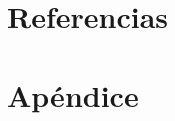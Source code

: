 \documentclass[letterpaper]{article}
\begin{document}
\section{Referencias}
\section{Apéndice}
\end{document}
